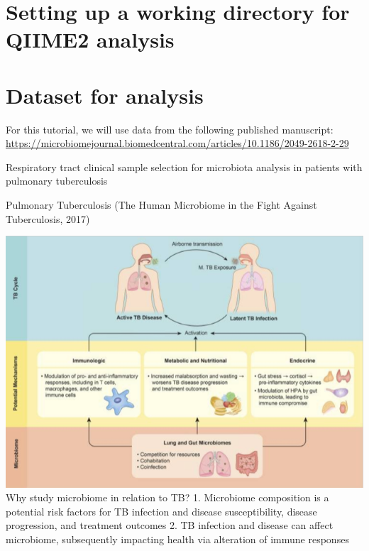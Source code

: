 \documentclass[
]{book}
\newenvironment{Shaded}{\begin{snugshade}}{\end{snugshade}}
\newcommand{\BuiltInTok}[1]{#1}
\newcommand{\FunctionTok}[1]{\textcolor[rgb]{0.00,0.00,0.00}{#1}}
\newcommand{\NormalTok}[1]{#1}
\newcommand{\VariableTok}[1]{\textcolor[rgb]{0.00,0.00,0.00}{#1}}
\begin{document}
\hypertarget{setting-up-a-working-directory-for-qiime2-analysis}{%
\section{Setting up a working directory for QIIME2 analysis}\label{setting-up-a-working-directory-for-qiime2-analysis}}

\begin{Shaded}
\end{Shaded}

\hypertarget{dataset-for-analysis}{%
\section{Dataset for analysis}\label{dataset-for-analysis}}

For this tutorial, we will use data from the following published manuscript:
\url{https://microbiomejournal.biomedcentral.com/articles/10.1186/2049-2618-2-29}

Respiratory tract clinical sample selection for microbiota analysis in patients with pulmonary tuberculosis

Pulmonary Tuberculosis (The Human Microbiome in the Fight Against Tuberculosis, 2017)

\includegraphics[width=1\textwidth,height=\textheight]{./QIIMEpics/lyx.qiime.png}
Why study microbiome in relation to TB?
1. Microbiome composition is a potential risk factors for TB infection and disease susceptibility, disease progression,
and treatment outcomes
2. TB infection and disease can affect microbiome, subsequently impacting health via alteration of immune responses
\end{document}

